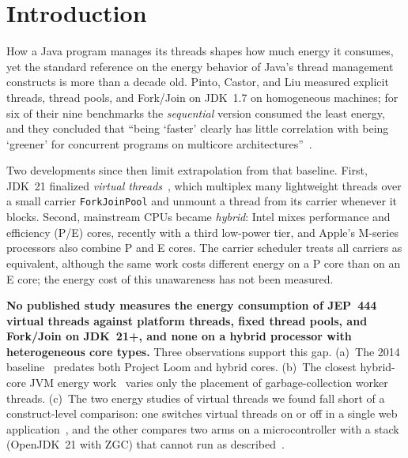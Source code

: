 \documentclass[sigconf,nonacm]{acmart}
\begin{document}
\maketitle

\section{Introduction}\label{sec:intro}
How a Java program manages its threads shapes how much energy it consumes, yet the standard reference on the energy behavior of Java's thread management constructs is more than a decade old. Pinto, Castor, and Liu measured explicit threads, thread pools, and Fork/Join on JDK~1.7 on homogeneous machines; for six of their nine benchmarks the \emph{sequential} version consumed the least energy, and they concluded that ``being `faster' clearly has little correlation with being `greener' for concurrent programs on multicore architectures''~\cite{pinto2014energy}.

Two developments since then limit extrapolation from that baseline. First, JDK~21 finalized \emph{virtual threads}~\cite{jep444}, which multiplex many lightweight threads over a small carrier \texttt{ForkJoinPool} and unmount a thread from its carrier whenever it blocks. Second, mainstream CPUs became \emph{hybrid}: Intel mixes performance and efficiency (P/E) cores, recently with a third low-power tier, and Apple's M-series processors also combine P and E cores. The carrier scheduler treats all carriers as equivalent, although the same work costs different energy on a P core than on an E core; the energy cost of this unawareness has not been measured.

\textbf{No published study measures the energy consumption of JEP~444 virtual threads against platform threads, fixed thread pools, and Fork/Join on JDK~21+, and none on a hybrid processor with heterogeneous core types.} Three observations support this gap. (a)~The 2014 baseline~\cite{pinto2014energy} predates both Project Loom and hybrid cores. (b)~The closest hybrid-core JVM energy work~\cite{shimchenko2024scheduling} varies only the placement of garbage-collection worker threads. (c)~The two energy studies of virtual threads we found fall short of a construct-level comparison: one switches virtual threads on or off in a single web application~\cite{stocker2026energyupgrades}, and the other compares two arms on a microcontroller with a stack (OpenJDK~21 with ZGC) that cannot run as described~\cite{shanjaikumar2026virtualthreads}.
\end{document}
